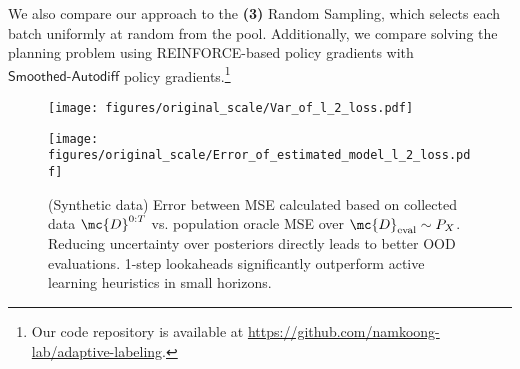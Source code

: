  
We also compare our approach to the  \textbf{(3)} \textsf{Random Sampling}, which selects each batch uniformly at random from the pool. Additionally, we compare solving the planning problem using  \textsf{REINFORCE}-based policy gradients with   $\mathsf{Smoothed\text{-}Autodiff}$ policy gradients.\footnote{Our code repository is available at
  \url{https://github.com/namkoong-lab/adaptive-labeling}.}





\begin{figure}[t]
\centering
\begin{minipage}[b]{0.49\textwidth}
\centering
\texttt{[image: figures/original\_scale/Var\_of\_l\_2\_loss.pdf]}
\caption{(Synthetic data) Variance of mean squared loss evaluated through the posterior belief $\mu_t$ at each horizon $t$. This is the objective that policy gradient methods like \textsf{REINFORCE} and $\ouralgo$ optimizes. 1-step lookaheads are surprisingly effective even in long horizons.}
\label{fig:var-l2-sim}
\end{minipage}
\hfill
\begin{minipage}[b]{0.49\textwidth}
\centering \texttt{[image: figures/original\_scale/Error\_of\_estimated\_model\_l\_2\_loss.pdf]}
\caption{(Synthetic data) Error between MSE calculated based on collected data $\mc{D}^{0:T}$ vs. population oracle MSE over $\mc{D}_{\rm eval} \sim P_X$. Reducing uncertainty over posteriors directly leads to better OOD evaluations. 1-step lookaheads significantly outperform active learning heuristics in small horizons.}
\label{fig:mean-l2-sim}
\end{minipage}
\end{figure}

